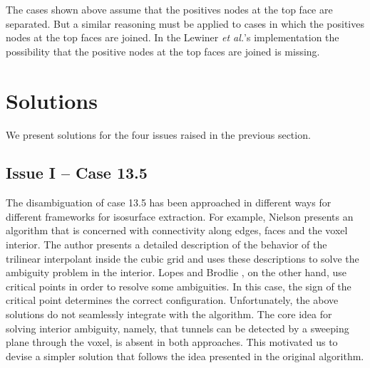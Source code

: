 The cases shown above assume that the positives nodes at the top face are separated. But a similar reasoning must be applied to cases in which the positives nodes at the top faces are joined. In the Lewiner \emph{et al.}'s implementation the possibility that the positive nodes at the top faces are joined is missing. 

\section{Solutions}
\label{sec:solution}
 
We present solutions for the four issues raised in the previous section. 
 
\subsection{Issue I -- Case 13.5}

The disambiguation of case 13.5 has been approached in different ways for different frameworks for isosurface extraction.  For example, Nielson \cite{10.1109/TVCG.2003.1207437} presents an algorithm that is  concerned with connectivity along edges, faces and the voxel interior. The author presents a detailed description of the behavior of the trilinear interpolant inside the cubic grid and uses these descriptions to solve the ambiguity problem in the interior. Lopes and Brodlie \cite{lopes:tvcg:2003}, on the other hand, use critical points in order to resolve some ambiguities. In this case, the sign of the critical point determines the correct configuration.
%
Unfortunately, the above solutions do not seamlessly integrate with the \mc{} algorithm. The core idea for solving interior ambiguity, namely, that tunnels can be detected by a sweeping plane through the voxel, is absent in both approaches. This motivated us to devise a simpler solution that follows the idea presented in the original algorithm.


